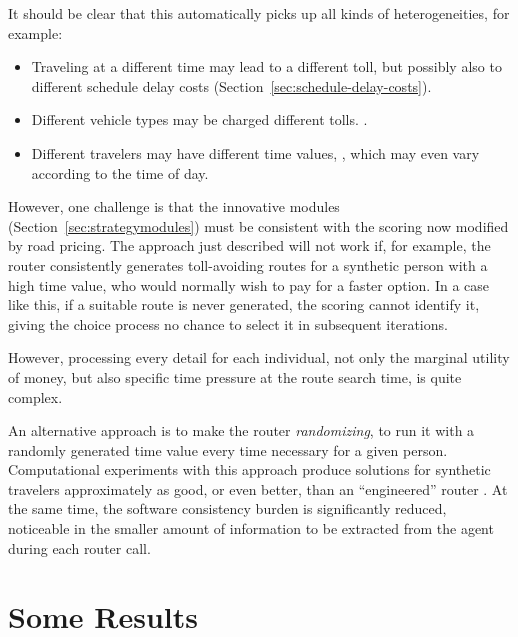 It should be clear that this automatically picks up all kinds of heterogeneities, for example:
\begin{itemize}\styleItemize
\item Traveling at a different time may lead to a different toll, but possibly also to different schedule delay costs (Section~\ref{sec:schedule-delay-costs}). 
\item Different vehicle types may be charged different tolls. \citep{KickhoeferNagel2013EmissionInternalizationNETS}.
\item Different travelers may have different time values, \citep{NagelKickhoeferJoubert2014HeterogeneousVoTsPROCEDIA}, which may even vary according to the time of day.
\end{itemize}

However, one challenge is that the innovative modules (Section~\ref{sec:strategymodules}) must be consistent with the scoring now modified by road pricing. The approach just described will not work if, for example, the router consistently generates toll-avoiding routes for a synthetic person with a high time value,  who would normally wish to pay for a faster option. In a case like this, if a suitable route is never generated, the scoring cannot identify it, giving  the choice process no chance to select it in subsequent iterations.

However, processing every detail for each individual, \ie not only the marginal utility of money, but also specific time pressure at the route search time, is quite complex.

An alternative approach is to make the router \emph{randomizing}, \ie to run it with a randomly generated time value every time necessary for a given person. Computational experiments with this approach produce solutions for synthetic travelers approximately as good, or even better, than an ``engineered'' router \citep{NagelKickhoeferJoubert2014HeterogeneousVoTsPROCEDIA}. At the same time, the software consistency burden is significantly reduced, noticeable in the smaller amount of information to be extracted from the agent during each router call.

\section{Some Results}
